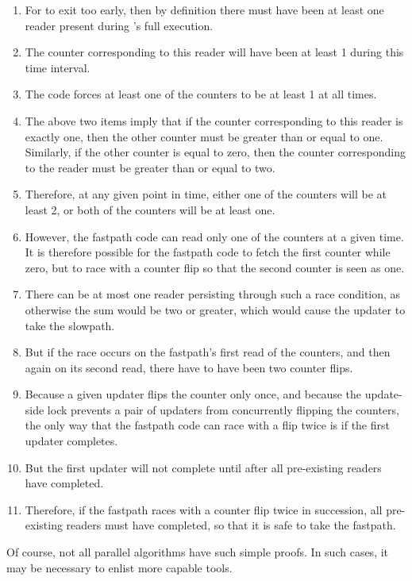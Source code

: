 \begin{enumerate}
\item	For  to exit too early, then
	by definition there must have been at least one reader
	present during 's full
	execution.
\item	The counter corresponding to this reader will have been
	at least 1 during this time interval.
\item	The  code forces at least one
	of the counters to be at least 1 at all times.
\item	The above two items imply that if the counter corresponding
	to this reader is exactly one, then the other counter must be
	greater than or equal to one.
	Similarly, if the other counter is equal to zero, then the counter
	corresponding to the reader must be greater than or equal to two.
\item	Therefore, at any given point in time, either one of the
	counters will be at least 2, or both of the counters will
	be at least one.
\item	However, the  fastpath code
	can read only one of the counters at a given time.
	It is therefore possible for the fastpath code to fetch
	the first counter while zero, but to race with a counter
	flip so that the second counter is seen as one.
\item	There can be at most one reader persisting through such
	a race condition, as otherwise the sum would be two or
	greater, which would cause the updater to take the slowpath.
\item	But if the race occurs on the fastpath's first read of the
	counters, and then again on its second read, there have
	to have been two counter flips.
\item	Because a given updater flips the counter only once, and
	because the update-side lock prevents a pair of updaters
	from concurrently flipping the counters, the only way that
	the fastpath code can race with a flip twice is if the
	first updater completes.
\item	But the first updater will not complete until after all
	pre-existing readers have completed.
\item	Therefore, if the fastpath races with a counter flip
	twice in succession, all pre-existing readers must have
	completed, so that it is safe to take the fastpath.
\end{enumerate}

Of course, not all parallel algorithms have such simple proofs.
In such cases, it may be necessary to enlist more capable tools.

